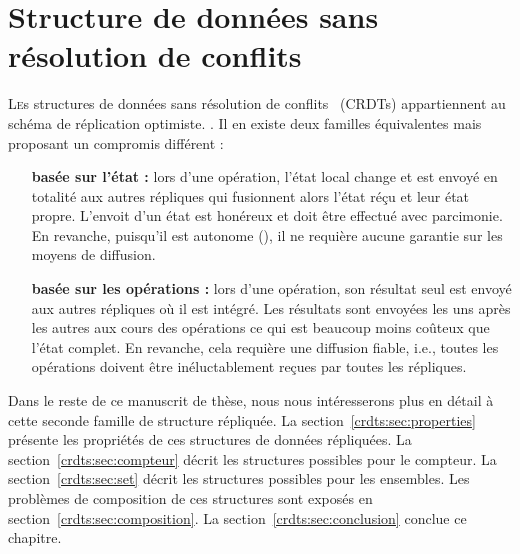 
\chapter{Structure de données sans résolution de conflits}
\label{repl:chap:crdts}

\minitoc

\lettrine{L}es structures de données sans résolution de
conflits~\cite{shapiro2011comprehensive} (CRDTs) appartiennent au schéma de
réplication optimiste. .  Il en existe deux
familles équivalentes mais proposant un compromis différent :
\begin{itemize}
\item [\textbf{basée sur l'état :}] lors d'une opération, l'état local change et
  est envoyé en totalité aux autres répliques qui fusionnent alors l'état réçu
  et leur état propre. L'envoit d'un état est honéreux et doit être effectué
  avec parcimonie. En revanche, puisqu'il est autonome
  (), il ne requière aucune garantie sur les moyens
  de diffusion.
\item [\textbf{basée sur les opérations :}] lors d'une opération, son résultat
  seul est envoyé aux autres répliques où il est intégré. Les résultats sont
  envoyées les uns après les autres aux cours des opérations ce qui est beaucoup
  moins coûteux que l'état complet. En revanche, cela requière une diffusion
  fiable, i.e., toutes les opérations doivent être inéluctablement reçues par
  toutes les répliques.
\end{itemize}

Dans le reste de ce manuscrit de thèse, nous nous intéresserons plus en détail à
cette seconde famille de structure répliquée. La
section~\ref{crdts:sec:properties} présente les propriétés de ces structures de
données répliquées. La section~\ref{crdts:sec:compteur} décrit les structures
possibles pour le compteur. La section~\ref{crdts:sec:set} décrit les structures
possibles pour les ensembles. Les problèmes de composition de ces structures
sont exposés en section~\ref{crdts:sec:composition}. La
section~\ref{crdts:sec:conclusion} conclue ce chapitre.


